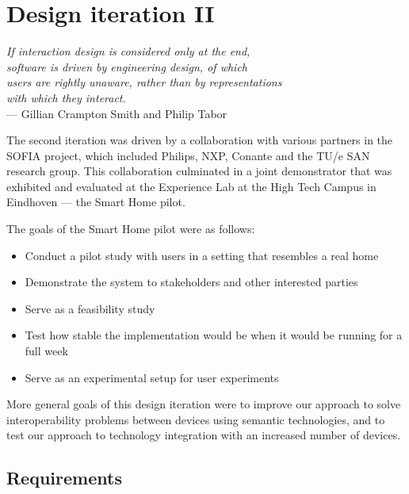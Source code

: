 \chapter{Design iteration II}
\label{DesignIteration2}
\begin{flushright}{\slshape    
If interaction design is considered only at the end, \\
software is driven by engineering design, of which \\
users are rightly unaware, rather than by representations \\
with which they interact.} \\ \medskip
    --- Gillian Crampton Smith and Philip Tabor \cite{Winograd1996}
\end{flushright}


The second iteration was driven by a collaboration with various partners in the \ac{SOFIA} project, which included Philips, NXP, Conante and the TU/e \ac{SAN} research group. This collaboration culminated in a joint demonstrator that was exhibited and evaluated at the Experience Lab at the High Tech Campus in Eindhoven --- the Smart Home pilot.

The goals of the Smart Home pilot were as follows:

\begin{itemize}
	\item Conduct a pilot study with users in a setting that resembles a real home
	\item Demonstrate the system to stakeholders and other interested parties
	\item Serve as a feasibility study
	\item Test how stable the implementation would be when it would be running for a full week
	\item Serve as an experimental setup for user experiments
\end{itemize}

More general goals of this design iteration were to improve our approach to solve interoperability problems between devices using semantic technologies, and to test our approach to technology integration with an increased number of devices.

\section{Requirements}
\label{D2Requirements}

